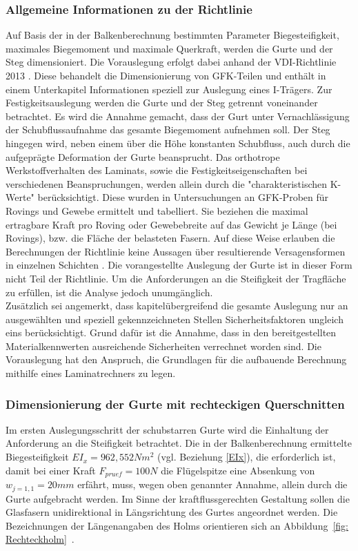 \subsubsection{Allgemeine Informationen zu der Richtlinie}
Auf Basis der in der Balkenberechnung bestimmten Parameter Biegesteifigkeit, maximales Biegemoment und maximale Querkraft, werden die Gurte und der Steg dimensioniert. Die Vorauslegung erfolgt dabei anhand der VDI-Richtlinie 2013 \cite{item5}. Diese behandelt die Dimensionierung von GFK-Teilen und enthält in einem Unterkapitel Informationen speziell zur Auslegung eines I-Trägers. Zur Festigkeitsauslegung werden die Gurte und der Steg getrennt voneinander betrachtet. Es wird die Annahme gemacht, dass der Gurt unter Vernachlässigung der Schubflussaufnahme das gesamte Biegemoment aufnehmen soll. Der Steg hingegen wird, neben einem über die Höhe konstanten Schubfluss, auch durch die aufgeprägte Deformation der Gurte beansprucht. Das orthotrope Werkstoffverhalten des Laminats, sowie die Festigkeitseigenschaften bei verschiedenen Beanspruchungen, werden allein durch die "charakteristischen K-Werte" \cite{item5} berücksichtigt. Diese wurden in Untersuchungen an GFK-Proben für Rovings und Gewebe ermittelt und tabelliert. Sie beziehen die maximal ertragbare Kraft pro Roving oder Gewebebreite auf das Gewicht je Länge (bei Rovings), bzw. die Fläche der belasteten Fasern. Auf diese Weise erlauben die Berechnungen der Richtlinie keine Aussagen über resultierende Versagensformen in einzelnen Schichten \cite{item5}. Die vorangestellte Auslegung der Gurte ist in dieser Form nicht Teil der Richtlinie. Um die Anforderungen an die Steifigkeit der Tragfläche zu erfüllen, ist die Analyse jedoch unumgänglich.\\

\noindent Zusätzlich sei angemerkt, dass kapitelübergreifend die gesamte Auslegung nur an ausgewählten und speziell gekennzeichneten Stellen Sicherheitsfaktoren ungleich eins berücksichtigt. Grund dafür ist die Annahme, dass in den bereitgestellten Materialkennwerten ausreichende Sicherheiten verrechnet worden sind. 
Die Vorauslegung hat den Anspruch, die Grundlagen für die aufbauende Berechnung mithilfe eines Laminatrechners zu legen.

\subsubsection{Dimensionierung der Gurte mit rechteckigen Querschnitten}
\label{GurtDim} 
Im ersten Auslegungsschritt der schubstarren Gurte wird die Einhaltung der Anforderung an die Steifigkeit betrachtet.   
Die in der Balkenberechnung ermittelte Biegesteifigkeit $ EI_{x} = 962,552 Nm^{2} $ (vgl. Beziehung \ref{EIx}), die erforderlich ist, damit bei einer Kraft $ F_{pruef}=100N $ die Flügelspitze eine Absenkung von $ w_{j=1,1}=20mm $ erfährt, muss, wegen oben genannter Annahme, allein durch die Gurte aufgebracht werden. Im Sinne der kraftflussgerechten Gestaltung sollen die Glasfasern unidirektional in Längsrichtung des Gurtes angeordnet werden. Die Bezeichnungen der Längenangaben des Holms orientieren sich an Abbildung~\ref{fig: Rechteckholm}~.\\


